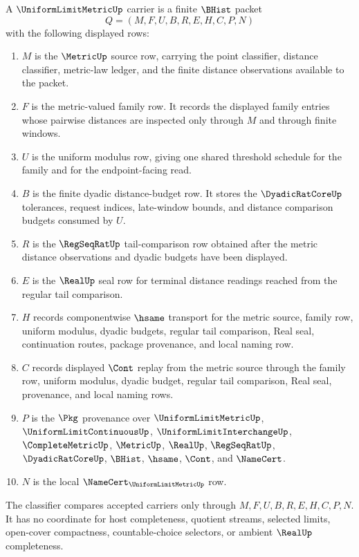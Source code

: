 \begin{definition}
\label{def:uniform-limit-metric-carrier}
A $\UniformLimitMetricUp$ carrier is a finite $\BHist$ packet
$$
Q=(M,F,U,B,R,E,H,C,P,N)
$$
with the following displayed rows:
\begin{enumerate}
\item $M$ is the $\MetricUp$ source row, carrying the point classifier, distance classifier, metric-law ledger, and the finite distance observations available to the packet.
\item $F$ is the metric-valued family row. It records the displayed family entries whose pairwise distances are inspected only through $M$ and through finite windows.
\item $U$ is the uniform modulus row, giving one shared threshold schedule for the family and for the endpoint-facing read.
\item $B$ is the finite dyadic distance-budget row. It stores the $\DyadicRatCoreUp$ tolerances, request indices, late-window bounds, and distance comparison budgets consumed by $U$.
\item $R$ is the $\RegSeqRatUp$ tail-comparison row obtained after the metric distance observations and dyadic budgets have been displayed.
\item $E$ is the $\RealUp$ seal row for terminal distance readings reached from the regular tail comparison.
\item $H$ records componentwise $\hsame$ transport for the metric source, family row, uniform modulus, dyadic budgets, regular tail comparison, Real seal, continuation routes, package provenance, and local naming row.
\item $C$ records displayed $\Cont$ replay from the metric source through the family row, uniform modulus, dyadic budget, regular tail comparison, Real seal, provenance, and local naming rows.
\item $P$ is the $\Pkg$ provenance over $\UniformLimitMetricUp$, $\UniformLimitContinuousUp$, $\UniformLimitInterchangeUp$, $\CompleteMetricUp$, $\MetricUp$, $\RealUp$, $\RegSeqRatUp$, $\DyadicRatCoreUp$, $\BHist$, $\hsame$, $\Cont$, and $\NameCert$.
\item $N$ is the local $\NameCert_{\UniformLimitMetricUp}$ row.
\end{enumerate}
The classifier compares accepted carriers only through $M,F,U,B,R,E,H,C,P,N$. It has no coordinate for host completeness, quotient streams, selected limits, open-cover compactness, countable-choice selectors, or ambient $\RealUp$ completeness.
\end{definition}

